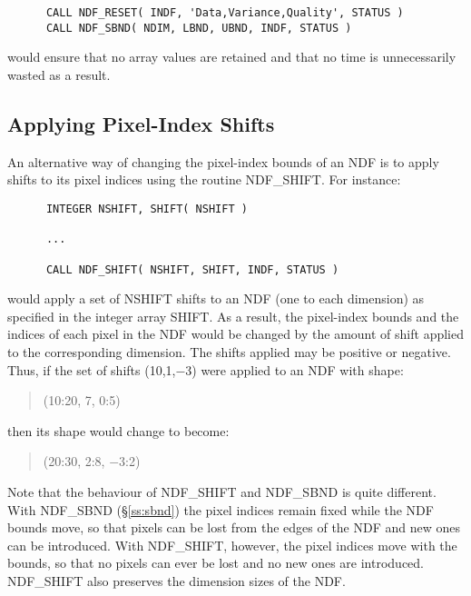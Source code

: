 \documentclass[twoside,11pt]{article}
\newcommand{\htmlref}[2]{#1}
\newcommand{\xlabel}[1]{}
\begin{document}
\small
\begin{verbatim}
      CALL NDF_RESET( INDF, 'Data,Variance,Quality', STATUS )
      CALL NDF_SBND( NDIM, LBND, UBND, INDF, STATUS )
\end{verbatim}
\normalsize

would ensure that no array values are retained and that no time is
unnecessarily wasted as a result.

\subsection{\xlabel{applying_pixel-index_shifts}\label{ss:shift}Applying Pixel-Index Shifts}

An alternative way of changing the pixel-index bounds of an NDF is to apply
shifts to its pixel indices using the routine \htmlref{NDF\_SHIFT}{NDF_SHIFT}. 
For instance:

\small
\begin{verbatim}
      INTEGER NSHIFT, SHIFT( NSHIFT )

      ...

      CALL NDF_SHIFT( NSHIFT, SHIFT, INDF, STATUS )
\end{verbatim}
\normalsize

would apply a set of NSHIFT shifts to an NDF (one to each dimension) as
specified in the integer array SHIFT. 
As a result, the pixel-index bounds and the indices of each pixel in the NDF
would be changed by the amount of shift applied to the corresponding
dimension. 
The shifts applied may be positive or negative. 
Thus, if the set of shifts (10,1,$-$3) were applied to an NDF with shape:

\small
\begin{quote}
\begin{center}
(10:20, 7, 0:5)
\end{center}
\end{quote}
\normalsize

then its shape would change to become:

\small
\begin{quote}
\begin{center}
(20:30, 2:8, $-$3:2)
\end{center}
\end{quote}
\normalsize

Note that the behaviour of NDF\_SHIFT and \htmlref{NDF\_SBND}{NDF_SBND} is quite different.
With NDF\_SBND (\S\ref{ss:sbnd}) the pixel indices remain fixed while the NDF
bounds move, so that pixels can be lost from the edges of the NDF and new
ones can be introduced. 
With NDF\_SHIFT, however, the pixel indices move with the bounds, so that 
no pixels can ever be lost and no new ones are introduced.
NDF\_SHIFT also preserves the dimension sizes of the NDF.
\end{document}
